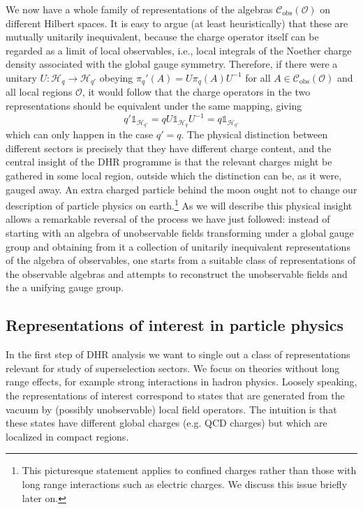\documentclass[12pt]{article}
\newcommand{\1}{\mathds{1}}                         %
\newcommand{\Ocal}{\mathcal{O}}
\newcommand{\HH}{{\mathcal{H}}}
\newcommand{\II}{{\mathbb{1}}}
\newcommand{\Cc}{{\mathcal{C}}}
\begin{document}
We now have a whole family of representations of the algebras $\Cc_{\text{obs}}(\Ocal)$ on different Hilbert spaces. It is easy to argue (at least heuristically) that these are mutually unitarily inequivalent, because the charge operator itself can be regarded as a limit of local observables, i.e., local integrals of the Noether charge density associated with the global gauge symmetry. Therefore, if there were a unitary $U:\HH_q\to\HH_{q'}$ obeying $\pi_q'(A) = U\pi_q(A)U^{-1}$ for all $A\in\Cc_{\text{obs}}(\Ocal)$ and all local regions $\Ocal$, it would follow that
the charge operators in the two representations should be equivalent under the same mapping, giving
\[
q'\II_{\HH_{q'}} = q U\II_{\HH_{q}} U^{-1} = q \II_{\HH_{q'}}
\] 
which can only happen in the case $q'=q$. The physical distinction between different sectors is precisely that they have different charge content, and the central insight of the DHR programme is that the relevant charges might be gathered in some local region, outside which the distinction can be, as it were, gauged away.  An extra charged particle behind the moon ought not to change our description of particle physics on earth.\footnote{This picturesque statement applies to confined charges rather than those with  long range interactions such as electric charges. We discuss this issue briefly later on.} As we will describe this physical insight allows a remarkable reversal of the process we have just followed: instead of starting with an algebra of unobservable fields transforming under a global gauge group and obtaining from it a collection of unitarily inequivalent representations of the algebra of observables, one starts from a suitable class of representations of the observable algebras and attempts to reconstruct the unobservable fields and the a unifying gauge group. 

\subsection{Representations of interest in particle physics}\label{interest}
In the first step of DHR analysis we want to single out a class of representations relevant for study of superselection sectors. We focus on theories without long range effects, for example strong interactions in hadron physics. Loosely speaking, the representations of interest correspond to states that are generated from the vacuum by (possibly unobservable) local field operators. The intuition is that these states have different global charges (e.g. QCD charges) but which are localized in compact regions.
\end{document}
